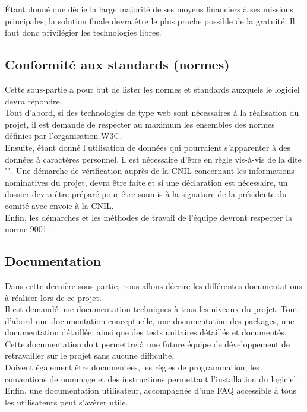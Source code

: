 Étant donné que \nomClient{} dédie la large majorité de ses moyens financiers à ses missions principales, la solution finale devra être le plus proche possible de la gratuité. Il faut donc privilégier les technologies libres.


\subsection{Conformité aux standards (normes)}
Cette sous-partie a pour but de lister les normes et standards auxquels le logiciel devra répondre.\\

Tout d'abord, si des technologies de type web sont nécessaires à la réalisation du projet, il est demandé de respecter au maximum les ensembles des normes définies par l'organisation W3C.\\

Ensuite, étant donné l'utilisation de données qui pourraient s'apparenter à des données à caractères personnel, il est nécessaire d'être en règle vis-à-vis de la \loiInfoLib{} dite "\loiInfoLibCourt{}". Une démarche de vérification auprès de la CNIL concernant les informations nominatives du projet, devra être faite et si une déclaration est nécessaire, un dossier devra être préparé pour être soumis à la signature de la présidente du comité avec envoie à la CNIL.\\

Enfin, les démarches et les méthodes de travail de l'équipe \PICCourt{} devront respecter la norme \ISOCourt{} 9001.

\subsection{Documentation}
\label{doc}
Dans cette dernière sous-partie, nous allons décrire les différentes documentations à réaliser lors de ce projet.\\

Il est demandé une documentation techniques à tous les niveaux du projet. Tout d'abord une documentation conceptuelle, une documentation des packages, une documentation détaillée, ainsi que des tests unitaires détaillés et documentés. Cette documentation doit permettre à une future équipe de développement de retravailler sur le projet sans aucune difficulté.\\

Doivent également être documentées, les règles de programmation, les conventions de nommage et des instructions permettant l'installation du logiciel.\\

Enfin, une documentation utilisateur, accompagnée d'une FAQ accessible à tous les utilisateurs peut s'avérer utile.
